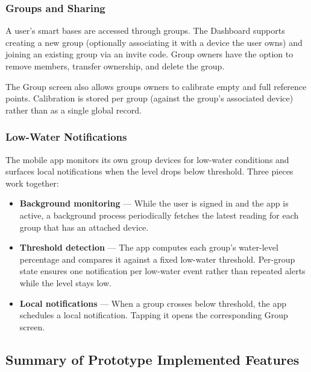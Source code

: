 \subsubsection{Groups and Sharing}
A user's smart bases are accessed through groups. The Dashboard supports creating a new group (optionally associating it with a device the user owns) and joining an existing group via an invite code. Group owners have the option to remove members, transfer ownership, and delete the group.

The Group screen also allows groups owners to calibrate empty and full reference points. Calibration is stored per group (against the group's associated device) rather than as a single global record.

\subsubsection{Low-Water Notifications}
The mobile app monitors its own group devices for low-water conditions and surfaces local notifications when the level drops below threshold. Three pieces work together:

\begin{itemize}
    \item \textbf{Background monitoring} --- While the user is signed in and the app is active, a background process periodically fetches the latest reading for each group that has an attached device.
    \item \textbf{Threshold detection} --- The app computes each group's water-level percentage and compares it against a fixed low-water threshold. Per-group state ensures one notification per low-water event rather than repeated alerts while the level stays low.
    \item \textbf{Local notifications} --- When a group crosses below threshold, the app schedules a local notification. Tapping it opens the corresponding Group screen.
\end{itemize}

\subsection{Summary of Prototype Implemented Features}

